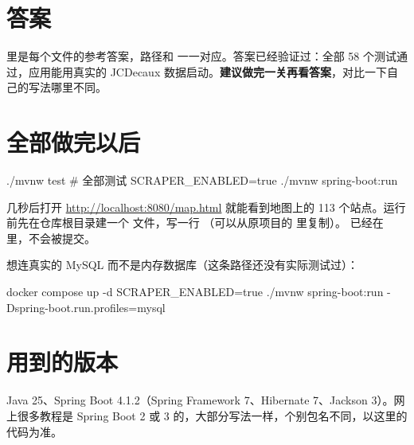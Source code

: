 \section*{答案}

 里是每个文件的参考答案，路径和  一一对应。答案已经验证过：全部 58 个测试通过，应用能用真实的 JCDecaux 数据启动。\textbf{建议做完一关再看答案}，对比一下自己的写法哪里不同。

\section*{全部做完以后}

\begin{shell}
./mvnw test                                  # 全部测试
SCRAPER_ENABLED=true ./mvnw spring-boot:run
\end{shell}

几秒后打开 \url{http://localhost:8080/map.html} 就能看到地图上的 113 个站点。运行前先在仓库根目录建一个  文件，写一行 （可以从原项目的  里复制）。 已经在  里，不会被提交。

想连真实的 MySQL 而不是内存数据库（这条路径还没有实际测试过）：

\begin{shell}
docker compose up -d
SCRAPER_ENABLED=true ./mvnw spring-boot:run -Dspring-boot.run.profiles=mysql
\end{shell}

\section*{用到的版本}

Java 25、Spring Boot 4.1.2（Spring Framework 7、Hibernate 7、Jackson 3）。网上很多教程是 Spring Boot 2 或 3 的，大部分写法一样，个别包名不同，以这里的代码为准。

